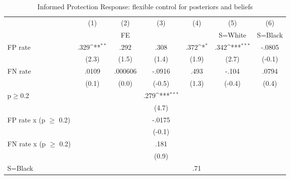 \begin{table}[htbp]\centering
\def\sym#1{\ifmmode^{#1}\else\(^{#1}\)\fi}
\caption{Informed Protection Response: flexible control for posteriors and beliefs}
\begin{tabular}{l*{6}{c}}
\hline\hline
                &\multicolumn{1}{c}{(1)}&\multicolumn{1}{c}{(2)}&\multicolumn{1}{c}{(3)}&\multicolumn{1}{c}{(4)}&\multicolumn{1}{c}{(5)}&\multicolumn{1}{c}{(6)}\\
                &\multicolumn{1}{c}{}&\multicolumn{1}{c}{FE}&\multicolumn{1}{c}{}&\multicolumn{1}{c}{}&\multicolumn{1}{c}{S=White}&\multicolumn{1}{c}{S=Black}\\
\hline
FP rate         &     .329\sym{**} &     .292         &     .308         &     .372\sym{*}  &     .342\sym{***}&   -.0805         \\
                &    (2.3)         &    (1.5)         &    (1.4)         &    (1.9)         &    (2.7)         &   (-0.1)         \\
FN rate         &    .0109         &  .000606         &   -.0916         &     .493         &    -.104         &    .0794         \\
                &    (0.1)         &    (0.0)         &   (-0.5)         &    (1.3)         &   (-0.4)         &    (0.4)         \\
p$\geq$0.2      &                  &                  &     .279\sym{***}&                  &                  &                  \\
                &                  &                  &    (4.7)         &                  &                  &                  \\
FP rate x (p $\geq$ 0.2)&                  &                  &   -.0175         &                  &                  &                  \\
                &                  &                  &   (-0.1)         &                  &                  &                  \\
FN rate x (p $\geq$ 0.2)&                  &                  &     .181         &                  &                  &                  \\
                &                  &                  &    (0.9)         &                  &                  &                  \\
S=Black         &                  &                  &                  &      .71         &                  &                  \\

\end{tabular}
\end{table}
